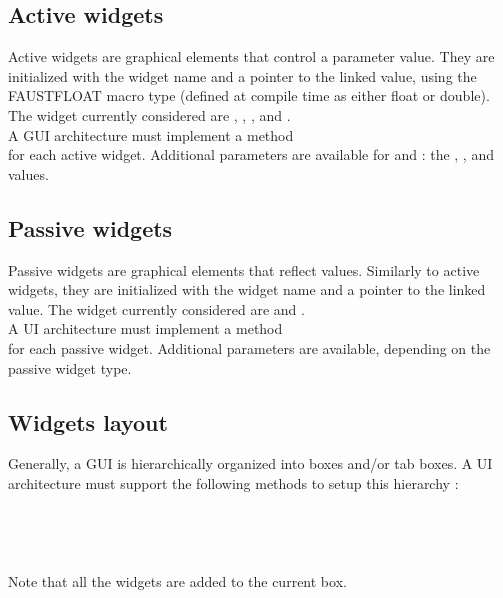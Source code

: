 \subsection{Active widgets}
\label{sec:awidget}
Active widgets are graphical elements that control a parameter value. They are initialized with the widget name and a pointer to the linked value, using the FAUSTFLOAT macro type (defined at compile time as either float or double).
The widget currently considered are ,  ,  ,   and  . \\
A GUI architecture must implement a method \\
 for each active widget.
Additional parameters are available for  and : the ,  ,   and  values.

\subsection{Passive widgets}
\label{sec:pwidget}
Passive widgets are graphical elements that reflect values. Similarly to active widgets, they are initialized with the widget name and a pointer to the linked value.
The widget currently considered are   and  . \\
A UI architecture must implement a method \\
 for each passive widget.
Additional parameters are available, depending on the passive widget type.

\subsection{Widgets layout}
\label{sec:wlayout}
Generally, a  GUI is hierarchically organized into boxes and/or tab boxes. 
A UI architecture must support the following methods to setup this hierarchy : \\
\htab{} \\
\htab{} \\
\htab{} \\
\htab{} \\
Note that all the widgets are added to the current box.

